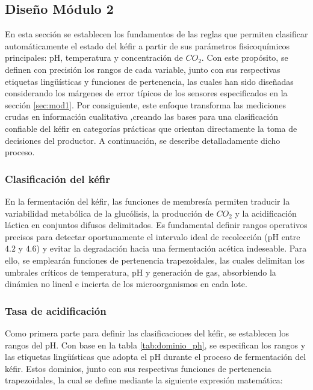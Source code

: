 \subsection{Diseño Módulo 2}

En esta sección se establecen los fundamentos de las reglas que permiten 
clasificar automáticamente el estado del kéfir a partir de sus parámetros 
fisicoquímicos principales: pH, temperatura y concentración de $CO_{2}$. 
Con este propósito, se definen con precisión los rangos de cada variable, 
junto con sus respectivas etiquetas lingüísticas y funciones de pertenencia, 
las cuales han sido diseñadas considerando los márgenes de error típicos de los sensores 
especificados en la sección \ref{sec:mod1}.
Por consiguiente, este enfoque transforma las mediciones crudas en información cualitativa 
,creando las bases para una clasificación confiable del kéfir en 
categorías prácticas que orientan directamente la toma de decisiones del productor. 
A continuación, se describe detalladamente dicho proceso.

\subsubsection{Clasificación del kéfir}


En la fermentación del kéfir, las funciones de membresía permiten traducir 
la variabilidad metabólica de la glucólisis, la producción de $CO_2$ y 
la acidificación láctica en conjuntos difusos delimitados. Es fundamental definir
rangos operativos precisos para detectar oportunamente el intervalo ideal de recolección
(pH entre $4.2$ y $4.6$) y evitar la degradación hacia una fermentación acética indeseable. 
Para ello, se emplearán funciones de pertenencia trapezoidales, 
las cuales delimitan los umbrales críticos de temperatura, pH y generación de gas,
absorbiendo la dinámica no lineal e incierta de los microorganismos en cada lote.
\subsubsection{Tasa de acidificación}


Como primera parte para definir las clasificaciones del kéfir, 
se establecen los rangos del pH. Con base en la tabla \cref{tab:dominio_ph},
se especifican los rangos y las etiquetas lingüísticas que adopta el pH durante 
el proceso de fermentación del kéfir. Estos dominios, junto con sus respectivas 
funciones de pertenencia trapezoidales, la cual se define mediante la siguiente expresión matemática:

